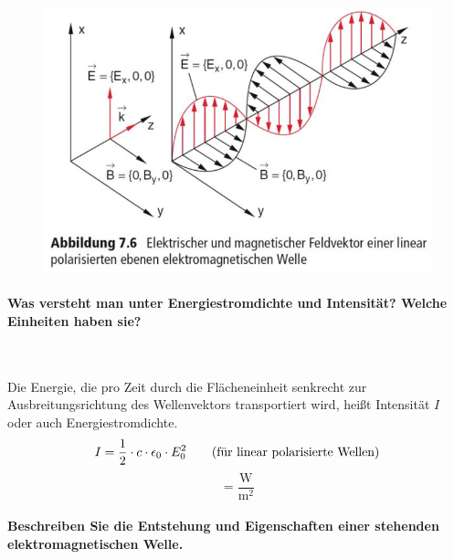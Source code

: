 \documentclass[a4paper, 11pt, parskip=half]{scrartcl}
\begin{document}
\begin{figure}[H]
    \centering
    \includegraphics[width=10 cm]{image/13/4.png}
\end{figure}

\paragraph{Was versteht man unter Energiestromdichte und Intensität? Welche Einheiten haben sie?} ~

Die Energie, die pro Zeit durch die Flächeneinheit senkrecht zur Ausbreitungsrichtung des
Wellenvektors transportiert wird, heißt Intensität $I$ oder auch Energiestromdichte.
\begin{equation}
I = \frac{1}{2} \cdot c \cdot \epsilon_0 \cdot E_0^2 \qquad \text{(für linear polarisierte Wellen)} \\
\end{equation}
\begin{equation}
[I] = \frac{\text{W}}{\text{m}^2}
\end{equation}

\newpage

\paragraph{Beschreiben Sie die Entstehung und Eigenschaften einer stehenden elektromagnetischen
Welle.} ~
\end{document}
